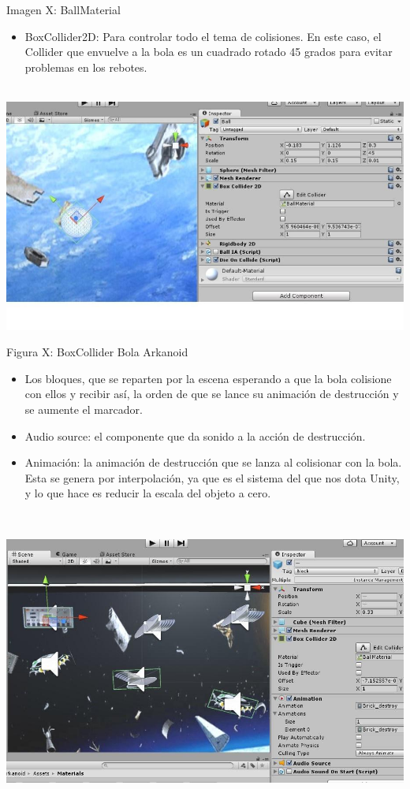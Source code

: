 \documentclass[]{article}
\begin{document}
Imagen X: BallMaterial

\begin{itemize}
\itemsep1pt\parskip0pt
\item
  BoxCollider2D: Para controlar todo el tema de colisiones. En este
  caso, el Collider que envuelve a la bola es un cuadrado rotado 45
  grados para evitar problemas en los rebotes.
\end{itemize}

~~~~~~~~~~~~~~~~~ ~~~~~~~~~~~~~~~~~\includegraphics{images/image16.jpg}

Figura X: BoxCollider Bola Arkanoid

\begin{itemize}
\itemsep1pt\parskip0pt
\item
  Los bloques, que se reparten por la escena esperando a que la bola
  colisione con ellos y recibir así, la orden de que se lance su
  animación de destrucción y se aumente el marcador.
\end{itemize}

\begin{itemize}
\itemsep1pt\parskip0pt
\item
  Audio source: el componente que da sonido a la acción de destrucción.
\item
  Animación: la animación de destrucción que se lanza al colisionar con
  la bola. Esta se genera por interpolación, ya que es el sistema del
  que nos dota Unity, y lo que hace es reducir la escala del objeto a
  cero.
\end{itemize}

~~~~~~~~~~~~~~~~~ ~~~~~~~~~~~~~~~~~

\includegraphics{images/image20.jpg}
\end{document}
